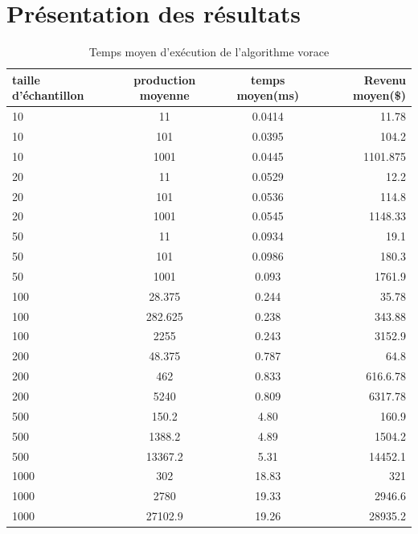 \documentclass[a4paper, 12pt]{article} %
\begin{document}
\section*{Présentation des résultats}
\begin{table}[H]
\caption{Temps moyen d'exécution de l'algorithme vorace}
\centering
\begin{tabular}{| l | c | c | r |}
\hline
taille d'échantillon & production moyenne & temps moyen(ms)  & Revenu moyen(\$)\\
\hline
10 & 11 & 0.0414 & 11.78\\
\hline
10 & 101 & 0.0395 & 104.2\\
\hline
10 & 1001 & 0.0445 & 1101.875\\
\hline
20 & 11 & 0.0529 & 12.2\\
\hline
20 & 101 & 0.0536 & 114.8\\
\hline
20 & 1001 & 0.0545 & 1148.33\\
\hline
50 & 11 & 0.0934 & 19.1\\
\hline
50 & 101 & 0.0986 & 180.3\\
\hline
50 & 1001 & 0.093 & 1761.9\\
\hline
100 & 28.375 & 0.244 & 35.78\\
\hline
100 & 282.625 & 0.238 & 343.88\\
\hline
100 & 2255 & 0.243 & 3152.9\\
\hline
200 & 48.375 & 0.787 & 64.8\\
\hline
200 & 462 & 0.833 & 616.6.78\\
\hline
200 & 5240 & 0.809 & 6317.78\\
\hline
500 & 150.2 & 4.80 & 160.9\\
\hline
500 & 1388.2 & 4.89  & 1504.2\\
\hline
500 & 13367.2 & 5.31 & 14452.1\\
\hline
1000 & 302 & 18.83 & 321\\
\hline
1000 & 2780 & 19.33 & 2946.6\\
\hline
1000 & 27102.9 & 19.26 & 28935.2\\
\hline
\end{tabular}
\end{table}
\end{document}
